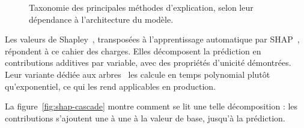 \begin{figure}[H]
\vspace{0.3cm}
\caption[Taxonomie des méthodes d'explication]%
        {Taxonomie des principales méthodes d'explication, selon leur dépendance à
         l'architecture du modèle.}
\label{fig:xai-taxo}
\end{figure}

Les valeurs de Shapley~\cite{shapley1953}, transposées à l'apprentissage automatique par
SHAP~\cite{lundberg2017}, répondent à ce cahier des charges. Elles décomposent la
prédiction en contributions additives par variable, avec des propriétés d'unicité
démontrées. Leur variante dédiée aux arbres~\cite{lundberg2020} les calcule en temps
polynomial plutôt qu'exponentiel, ce qui les rend applicables en production.

La figure~\ref{fig:shap-cascade} montre comment se lit une telle décomposition : les
contributions s'ajoutent une à une à la valeur de base, jusqu'à la prédiction.

